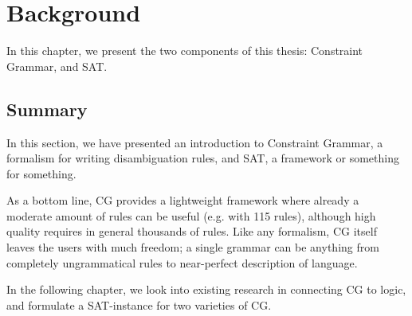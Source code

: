 \chapter{Background}

In this chapter, we present the two components of this thesis: Constraint Grammar, and SAT.





\section{Summary}

In this section, we have presented an introduction to Constraint Grammar, a formalism for writing disambiguation rules, and SAT, a framework or something for something.



 



As a bottom line, CG provides a lightweight framework where already a
moderate amount of rules can be useful (e.g. \cite{lene_trond2011} with 115
rules), although high quality requires in general thousands of rules.
Like any formalism, CG itself leaves the users with much freedom; a
single grammar can be anything from completely ungrammatical rules to near-perfect description of language.

In the following chapter, we look into existing research in connecting CG to logic, and formulate a SAT-instance for two varieties of CG.

